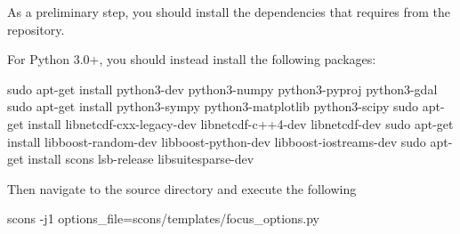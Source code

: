 \noindent As a preliminary step, you should install the dependencies that \esfinley requires from the repository.

For Python 3.0+, you should instead install the following packages:
\begin{shellCode}
sudo apt-get install python3-dev python3-numpy python3-pyproj python3-gdal
sudo apt-get install python3-sympy python3-matplotlib python3-scipy
sudo apt-get install libnetcdf-cxx-legacy-dev libnetcdf-c++4-dev libnetcdf-dev
sudo apt-get install libboost-random-dev libboost-python-dev libboost-iostreams-dev
sudo apt-get install scons lsb-release libsuitesparse-dev
\end{shellCode}



\noindent Then navigate to the source directory and execute the following 
\begin{shellCode}
scons -j1 options_file=scons/templates/focus_options.py
\end{shellCode}




